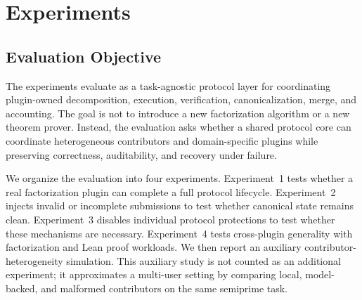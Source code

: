 \documentclass{article}
\theoremstyle{plain}
\begin{document}
%
%
%

\begingroup
\color{blue}

\makeatletter
\let\TSoldmakecaption\@makecaption
\renewcommand{\@makecaption}[2]{%
  \vskip\abovecaptionskip
  \sbox\@tempboxa{{\color{blue}\small #1: #2}}%
  \ifdim \wd\@tempboxa >\hsize
    {\color{blue}\small #1: #2\par}%
  \else
    \global\@minipagefalse
    \hb@xt@\hsize{\hfil\box\@tempboxa\hfil}%
  \fi
  \vskip\belowcaptionskip}
\makeatother

\section{Experiments}
\label{sec:experiments}

\subsection{Evaluation Objective}
\label{subsec:evaluation-objective}

The experiments evaluate \TS{} as a task-agnostic protocol layer for coordinating
plugin-owned decomposition, execution, verification, canonicalization, merge, and
accounting. The goal is not to introduce a new factorization algorithm or a new
theorem prover. Instead, the evaluation asks whether a shared protocol core can
coordinate heterogeneous contributors and domain-specific plugins while
preserving correctness, auditability, and recovery under failure.

We organize the evaluation into four experiments. Experiment~1 tests whether a
real factorization plugin can complete a full protocol lifecycle. Experiment~2
injects invalid or incomplete submissions to test whether canonical state remains
clean. Experiment~3 disables individual protocol protections to test whether
these mechanisms are necessary. Experiment~4 tests cross-plugin generality with
factorization and Lean proof workloads. We then report an auxiliary
contributor-heterogeneity simulation. This auxiliary study is not counted as an
additional experiment; it approximates a multi-user setting by comparing local,
model-backed, and malformed contributors on the same semiprime task.
\end{document}
